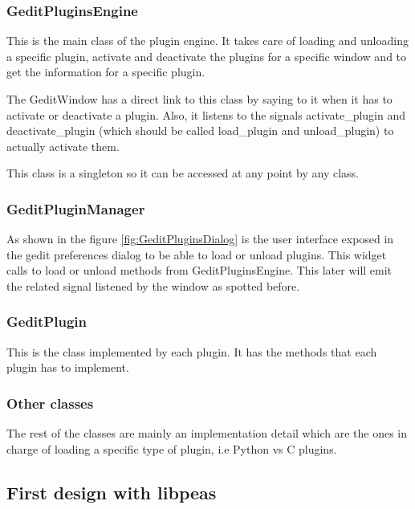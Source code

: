 \subsubsection{GeditPluginsEngine}

This is the main class of the plugin engine. It takes care of loading and unloading a specific plugin, activate and deactivate the plugins for a specific window and to get the information for a specific plugin.

The GeditWindow has a direct link to this class by saying to it when it has to activate or deactivate a plugin. Also, it listens to the signals activate\_plugin and deactivate\_plugin (which should be called load\_plugin and unload\_plugin) to actually activate them.

This class is a singleton so it can be accessed at any point by any class.

\newpage
\subsubsection{GeditPluginManager}


As shown in the figure \ref{fig:GeditPluginsDialog} is the user interface exposed in the gedit preferences dialog to be able to load or unload plugins. This widget calls to load or unload methods from GeditPluginsEngine. This later will emit the related signal listened by the window as spotted before.

\subsubsection{GeditPlugin}

This is the class implemented by each plugin. It has the methods that each plugin has to implement.

\subsubsection{Other classes}

The rest of the classes are mainly an implementation detail which are the ones in charge of loading a specific type of plugin, i.e Python vs C plugins.

\newpage
\subsection{First design with libpeas}

